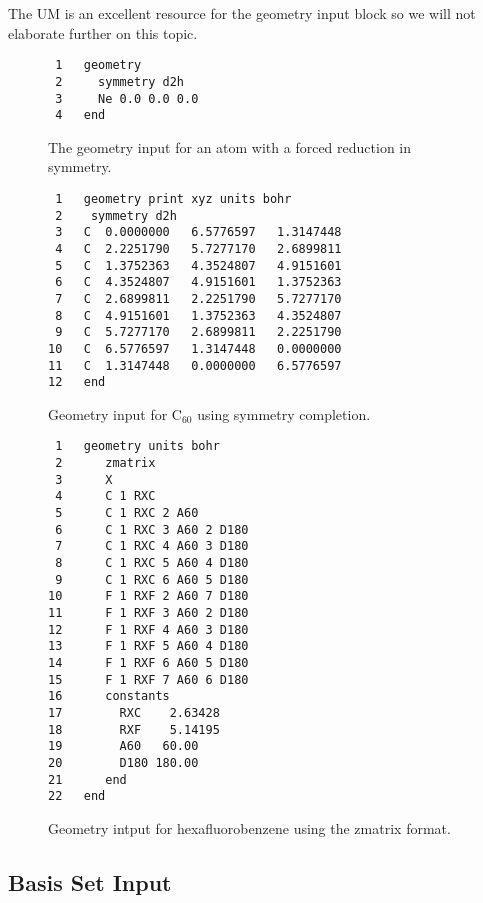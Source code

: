 \documentclass[letterpaper,12pt]{article}
\begin{document}
The UM is an excellent resource for the geometry input block so we will not elaborate further on this topic.

\begin{figure}
    \caption{The geometry input for an atom with a forced reduction in symmetry.}
    \label{fig:NeonGeometry}
    \begin{verbatim}
 1   geometry
 2     symmetry d2h
 3     Ne 0.0 0.0 0.0
 4   end
    \end{verbatim}
\end{figure}

\begin{figure}
    \caption{Geometry input for C$_{60}$ using symmetry completion.}
    \label{fig:C60geometry}
    \begin{verbatim}
 1   geometry print xyz units bohr
 2    symmetry d2h
 3   C  0.0000000   6.5776597   1.3147448
 4   C  2.2251790   5.7277170   2.6899811
 5   C  1.3752363   4.3524807   4.9151601
 6   C  4.3524807   4.9151601   1.3752363
 7   C  2.6899811   2.2251790   5.7277170
 8   C  4.9151601   1.3752363   4.3524807
 9   C  5.7277170   2.6899811   2.2251790
10   C  6.5776597   1.3147448   0.0000000
11   C  1.3147448   0.0000000   6.5776597
12   end
    \end{verbatim}
\end{figure}

\begin{figure}
    \caption{Geometry intput for hexafluorobenzene using the zmatrix format.}
    \label{fig:HexafluorobenzeneZMatrix}
    \begin{verbatim}
 1   geometry units bohr
 2      zmatrix
 3      X
 4      C 1 RXC
 5      C 1 RXC 2 A60
 6      C 1 RXC 3 A60 2 D180
 7      C 1 RXC 4 A60 3 D180
 8      C 1 RXC 5 A60 4 D180
 9      C 1 RXC 6 A60 5 D180
10      F 1 RXF 2 A60 7 D180
11      F 1 RXF 3 A60 2 D180
12      F 1 RXF 4 A60 3 D180
13      F 1 RXF 5 A60 4 D180
14      F 1 RXF 6 A60 5 D180
15      F 1 RXF 7 A60 6 D180
16      constants
17        RXC    2.63428
18        RXF    5.14195
19        A60   60.00
20        D180 180.00
21      end
22   end
    \end{verbatim}
\end{figure}

\newpage

\subsection{Basis Set Input}\label{sec:BasisSetInput}
\end{document}
